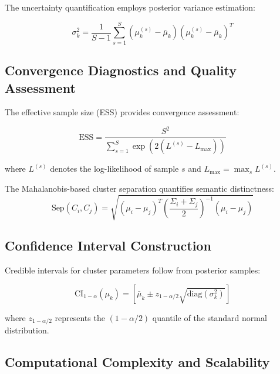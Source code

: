 The uncertainty quantification employs posterior variance estimation:

\begin{equation}
\sigma_k^2 = \frac{1}{S-1} \sum_{s=1}^S (\mu_k^{(s)} - \bar{\mu}_k)(\mu_k^{(s)} - \bar{\mu}_k)^T
\label{eq:posterior-variance}
\end{equation}

\subsection{Convergence Diagnostics and Quality Assessment}

The effective sample size (ESS) provides convergence assessment:

\begin{equation}
\text{ESS} = \frac{S^2}{\sum_{s=1}^S \exp(2(L^{(s)} - L_{\max}))}
\label{eq:effective-sample-size}
\end{equation}

where $L^{(s)}$ denotes the log-likelihood of sample $s$ and $L_{\max} = \max_s L^{(s)}$.

\begin{definition}
The Mahalanobis-based cluster separation quantifies semantic distinctness:
\begin{equation}
\text{Sep}(C_i, C_j) = \sqrt{(\mu_i - \mu_j)^T \left(\frac{\Sigma_i + \Sigma_j}{2}\right)^{-1} (\mu_i - \mu_j)}
\label{eq:cluster-separation}
\end{equation}
\end{definition}

\subsection{Confidence Interval Construction}

Credible intervals for cluster parameters follow from posterior samples:

\begin{equation}
\text{CI}_{1-\alpha}(\mu_k) = \left[ \bar{\mu}_k \pm z_{1-\alpha/2} \sqrt{\text{diag}(\sigma_k^2)} \right]
\label{eq:credible-intervals}
\end{equation}

where $z_{1-\alpha/2}$ represents the $(1-\alpha/2)$ quantile of the standard normal distribution.

\subsection{Computational Complexity and Scalability}

